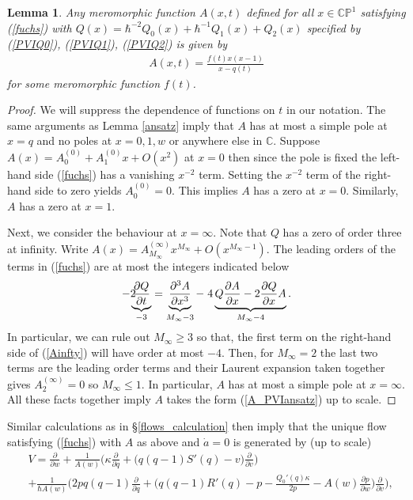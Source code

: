 \documentclass[a4paper,12pt,reqno]{amsart}
\newcounter{counter2}
\numberwithin{equation}{section}
\numberwithin{counter2}{section}
\newcounter{counter3}
\newtheorem{lemma}[counter2]{Lemma}
\begin{document}
\begin{lemma}\label{PVIansatz}
Any meromorphic function $A(x,t)$ defined for all $x \in \mathbb{CP}^1$ satisfying \rm{(\ref{fuchs})} with $Q(x) = \hbar^{-2}Q_0(x) + \hbar^{-1}Q_1(x) + Q_2(x)$ specified by (\ref{PVIQ0}),  (\ref{PVIQ1}),  (\ref{PVIQ2}) is given by
\begin{align}\label{A_PVIansatz}
A(x,t) = \frac{f(t)x(x-1)}{x-q(t)}
\end{align}
for some meromorphic function $f(t)$.  
\end{lemma}
\begin{proof}
We will suppress the dependence of functions on $t$ in our notation.  
The same arguments as Lemma \ref{ansatz} imply that $A$ has at most a simple pole at $x = q$ and no poles at $x = 0,1,w$ or anywhere else in $\mathbb{C}$.  Suppose $A(x) = A^{(0)}_0 + A^{(0)}_1x + O(x^2)$ at $x = 0$ then since the pole is fixed the left-hand side (\ref{fuchs}) has a vanishing $x^{-2}$ term.  Setting the $x^{-2}$ term of the right-hand side to zero yields $A^{(0)}_0 = 0$.  This implies $A$ has a zero at $x = 0$.  Similarly,  $A$ has a zero at $x = 1$.  \par
Next,  we consider the behaviour at $x = \infty$.  Note that $Q$ has a zero of order three at infinity.  Write $A(x) = A_{M_\infty}^{(\infty)}x^{M_\infty} + O(x^{M_\infty-1})$.  The leading orders of the terms in (\ref{fuchs}) are at most the integers indicated below 
\begin{align}\label{Ainfty}
-2 \hspace{-2mm}\underbrace{\frac{\partial Q}{\partial t}}_{-3} = \underbrace{\frac{\partial^3 A}{\partial x^3}}_{M_\infty -3} -  \hspace{1mm} 4\underbrace{Q\frac{\partial A}{\partial x} - 2\frac{\partial Q}{\partial x}A}_{M_\infty - 4}.  
\end{align}
In particular,  we can rule out $M_\infty \ge 3$ so that,  the first term on the right-hand side of (\ref{Ainfty}) will have order at most $-4$.  Then,  for $M_\infty = 2$ the last two terms are the leading order terms and their Laurent expansion taken together gives $A_{2}^{(\infty)} = 0$ 
so $M_\infty \le 1$.  In particular,  $A$ has at most a simple pole at $x = \infty$.  All these facts together imply $A$ takes the form (\ref{A_PVIansatz}) up to scale.  
\end{proof}
Similar calculations as in \S \ref{flows_calculation} then imply that the unique flow satisfying (\ref{fuchs}) with $A$ as above and $\dot{a} = 0$ is generated by (up to scale)
\begin{align}\label{PVIgenerator}
&V = \frac{\partial}{\partial w} + \frac{1}{A(w)}\Bigg(\kappa\frac{\partial}{\partial q} + \Big(q(q-1)S'(q)-v\Big)\frac{\partial}{\partial v}\Bigg) \\ \nonumber &+ \frac{1}{\hbar A(w)}\Bigg(2pq(q-1)\frac{\partial}{\partial q} + \bigg(q(q-1)R'(q) - p - \frac{Q_0'(q)\kappa}{2p}-A(w)\frac{\partial p}{\partial w}\bigg)\frac{\partial}{\partial v} \Bigg),  
\end{align}
\end{document}
